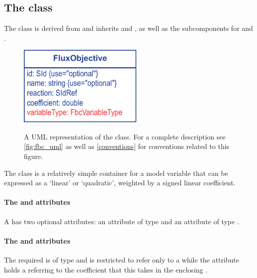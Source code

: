 \subsection{The \FBC {} class}

The \FBC \FluxObjective class is derived from \SBML \SBase and inherits
 and , as well as the subcomponents for
\Annotation and \Notes.
%
\begin{figure}[ht]
  \centering
  \includegraphics[width=6cm]{images/fbc_v3_uml_fobj.pdf}\\
  \caption{A UML representation of the \FBCPackage \FluxObjective class. For a complete description see \ref{fig:fbc_uml} as well as \ref{conventions} for conventions related to this figure.}
  \label{fig:fbc_uml_userconstraint}
\end{figure}
%
The \FluxObjective class is a relatively simple container for a model
variable that can be expressed as a `linear' or `quadratic', weighted by a signed linear coefficient.

\paragraph{The  and  attributes}
A \FluxObjective has two optional attributes:  an attribute of
type  and  an attribute of type .

\paragraph{The  and  attributes}
The required  is of type  and is restricted
to refer only to a \Reaction while the  attribute
holds a  referring to the coefficient that this \FluxObjective
takes in the enclosing \Objective.


